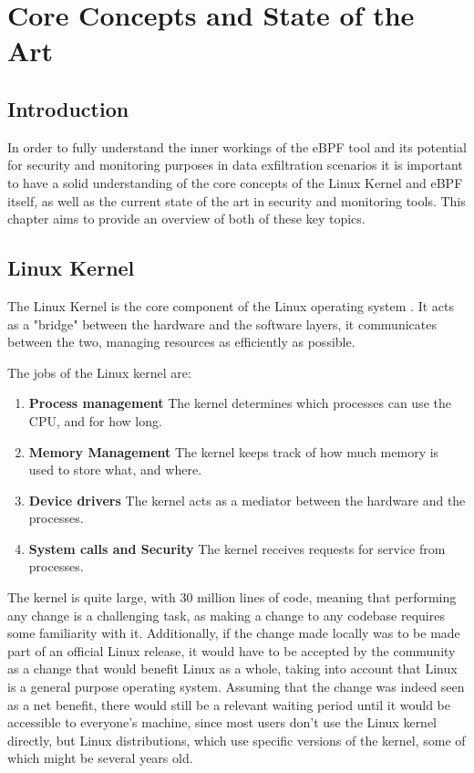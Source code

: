 \chapter{Core Concepts and State of the Art}

\section{Introduction}

In order to fully understand the inner workings of the eBPF tool and its potential for security and monitoring purposes in data exfiltration scenarios it is important to have a solid understanding of the core concepts of the Linux Kernel and eBPF itself, as well as the current state of the art in security and monitoring tools.
This chapter aims to provide an overview of both of these key topics.



\section{Linux Kernel}
The Linux Kernel is the core component of the Linux operating system \cite{kernel}. It acts as a "bridge" between the hardware and the software layers, it communicates between the two, managing resources as efficiently as possible. 

The jobs of the Linux kernel are:
\begin{enumerate}
    \item \textbf{Process management}
        The kernel determines which processes can use the CPU, and for how long.
    \item \textbf{Memory Management}
        The kernel keeps track of how much memory is used to store what, and where.
    \item \textbf{Device drivers}
        The kernel acts as a mediator between the hardware and the processes.
    \item \textbf{System calls and Security}
        The kernel receives requests for service from processes.
\end{enumerate}


The kernel is quite large, with 30 million lines of code, meaning that performing any change is a challenging task, as making a change to any codebase requires some familiarity with it. Additionally, if the change made locally was to be made part of an official Linux release, it would have to be accepted by the community as a change that would benefit Linux as a whole, taking into account that Linux is a general purpose operating system. Assuming that the change was indeed seen as a net benefit, there would still be a relevant waiting period until it would be accessible to everyone's machine, since most users don't use the Linux kernel directly, but Linux distributions, which use specific versions of the kernel, some of which might be several years old. 


